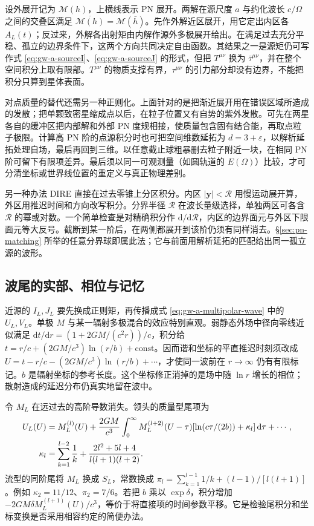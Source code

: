 设外展开记为 $\mathcal M(h)$，上横线表示 PN 展开。两解在源尺度 $a$ 与约化波长 $c/\Omega$ 之间的交叠区满足 $\overline{\mathcal M(h)}=\mathcal M(\bar h)$。先作外解近区展开，用它定出内区各 $A_L(t)$；反过来，外解各出射矩由内解作源外多极展开给出。在满足过去充分平稳、孤立的边界条件下，这两个方向共同决定自由函数。其结果之一是源矩仍可写作式 \eqref{eq:gw-a-sourceI}、\eqref{eq:gw-a-sourceJ} 的形式，但把 $T^{\mu\nu}$ 换为 $\bar\tau^{\mu\nu}$，并在整个空间积分上取有限部。$T^{\mu\nu}$ 的物质支撑有界，$\tau^{\mu\nu}$ 的引力部分却没有边界，不能把积分只算到星体表面。

对点质量的替代还需另一种正则化。上面针对的是把渐近展开用在错误区域所造成的发散；把单颗致密星缩成点以后，在粒子位置又有自势的紫外发散。可先在两星各自的缓冲区把内部解和外部 PN 度规相接，使质量包含固有结合能，再取点粒子极限。计算高 PN 阶的点源积分时也可把空间维数延拓为 $d=3+\varepsilon$，以解析延拓处理自场，最后再回到三维。以任意截止球粗暴删去粒子附近一块，在相同 PN 阶可留下有限项差异。最后须以同一可观测量（如圆轨道的 $E(\Omega)$）比较，才可分清坐标或世界线位置的重定义与真正物理差别。

另一种办法 DIRE 直接在过去零锥上分区积分。内区 $|\bm y|<\mathcal R$ 用慢运动展开算，外区用推迟时间和方向改写积分。分界半径 $\mathcal R$ 在波长量级选择，单独两区可各含 $\mathcal R$ 的幂或对数。一个简单检查是对精确积分作 $\mathrm d/\mathrm d\mathcal R$，内区的边界面元与外区下限面元等大反号。截断到某一阶后，在两侧都展开到该阶仍须有同样消去。\S\ref{sec:pn-matching} 所举的任意分界球即属此法；它与前面用解析延拓的匹配给出同一孤立源的波形。

\subsection{波尾的实部、相位与记忆}

近源的 $I_L,J_L$ 要先换成正则矩，再传播成式 \eqref{eq:gw-a-multipolar-wave} 中的 $U_L,V_L$。单极 $M$ 与某一辐射多极混合的效应特别直观。弱静态外场中径向零线近似满足 $\mathrm dt/\mathrm dr=(1+2GM/(c^2r))/c$，积分给 $t=r/c+(2GM/c^3)\ln(r/b)+\mathrm{const}$。因而谐和坐标的平直推迟时刻须改成 $U=t-r/c-(2GM/c^3)\ln(r/b)+\cdots$，才使同一波前在 $r\to\infty$ 仍有有限标记。$b$ 是辐射坐标的参考长度。这个坐标修正消掉的是场中随 $\ln r$ 增长的相位；散射造成的延迟分布仍真实地留在波中。

令 $M_L$ 在远过去的高阶导数消失。领头的质量型尾项为
\begin{align}
 U_L(U)&=M_L^{(l)}(U)
 +\frac{2GM}{c^3}\int_0^\infty M_L^{(l+2)}(U-\tau)
             [\ln(c\tau/(2b))+\kappa_l]\,\mathrm d\tau+\cdots ,
 \label{eq:gw-a-tails}\\
 \kappa_l&=\sum_{k=1}^{l-2}\frac1k+
       \frac{2l^2+5l+4}{l(l+1)(l+2)} .\notag
\end{align}
流型的同阶尾将 $M_L$ 换成 $S_L$，常数换成 $\pi_l=\sum_{k=1}^{l-1}1/k+(l-1)/[l(l+1)]$。例如 $\kappa_2=11/12$、$\pi_2=7/6$。若把 $b$ 乘以 $\exp\delta$，积分增加 $-2GM\delta M_L^{(l+1)}(U)/c^3$，等价于将直接项的时间参数平移。它是检验尾积分和坐标变换是否采用相容约定的简便办法。

